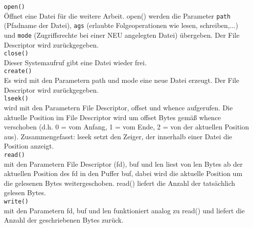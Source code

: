 \begin{answer}
  \texttt{open()}\\
  Öffnet eine Datei für die weitere Arbeit. open() werden die Parameter \texttt{path} (Pfadname der Datei),
  \texttt{ags} (erlaubte Folgeoperationen wie lesen, schreiben,...) und \texttt{mode} (Zugriffsrechte bei einer NEU
  angelegten Datei) übergeben. Der File Descriptor wird zurückgegeben.
  \\

  \texttt{close()}\\
  Dieser Systemaufruf gibt eine Datei wieder frei.
  \\

  \texttt{create()}\\
  Es wird mit den Parametern path und mode eine neue Datei erzeugt. Der File Descriptor wird
  zurückgegeben.
  \\

  \texttt{lseek()}\\
  wird mit den Parametern File Descriptor, offset und whence aufgerufen. Die aktuelle Position im
  File Descriptor wird um offset Bytes gemäß whence verschoben (d.h. 0 = vom Anfang, 1 = vom
  Ende, 2 = von der aktuellen Position aus).
  Zusammengefasst: lseek setzt den Zeiger, der innerhalb einer Datei die Position anzeigt.
  \\

  \texttt{read()}\\
  mit den Parametern File Descriptor (fd), buf und len liest von len Bytes ab der aktuellen Position
  des fd in den Puffer buf, dabei wird die aktuelle Position um die gelesenen Bytes weitergeschoben.
  read() liefert die Anzahl der tatsächlich gelesen Bytes.
  \\

  \texttt{write()}\\
  mit den Parametern fd, buf und len funktioniert analog zu read() und liefert die Anzahl der geschriebenen
  Bytes zurück.
\end{answer}

